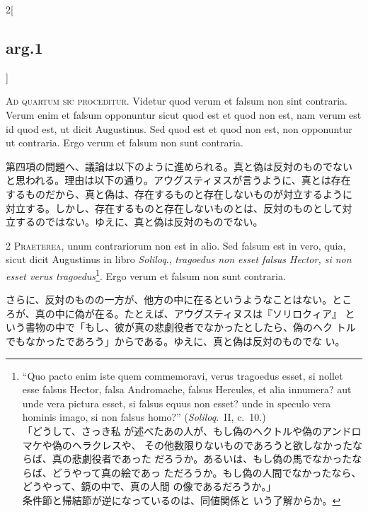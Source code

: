 \documentclass[paper=a4paper,fontsize=10pt,jafontsize=9pt,titlepage]{jlreq}
\begin{document}
\begin{paracol}{2}[\subsection{arg.1}]


{\huge A}{\scshape d quartum sic proceditur}. Videtur quod verum et
falsum non sint contraria. Verum enim et falsum opponuntur sicut quod
est et quod non est, nam verum est id quod est, ut dicit
Augustinus. Sed quod est et quod non est, non opponuntur ut
contraria. Ergo verum et falsum non sunt contraria.

\switchcolumn

第四項の問題へ、議論は以下のように進められる。真と偽は反対のものでない
と思われる。理由は以下の通り。アウグスティヌスが言うように、真とは存在
するものだから、真と偽は、存在するものと存在しないものが対立するように
対立する。しかし、存在するものと存在しないものとは、反対のものとして対
立するのではない。ゆえに、真と偽は反対のものでない。



{\scshape 2 Praeterea}, unum contrariorum non est in alio. Sed falsum
est in vero, quia, sicut dicit Augustinus in libro {\itshape
Soliloq}., {\itshape tragoedus non esset falsus Hector, si non esset
verus tragoedus}\footnote{ ``Quo pacto enim iste quem commemoravi,
verus tragoedus esset, si nollet esse falsus Hector, falsa Andromache,
falsus Hercules, et alia innumera? aut unde vera pictura esset, si
falsus equus non esset? unde in speculo vera hominis imago, si non
falsus homo?''  ({\itshape Soliloq}.~II, c.~10.)\\「どうして、さっき私
が述べたあの人が、もし偽のヘクトルや偽のアンドロマケや偽のヘラクレスや、
その他数限りないものであろうと欲しなかったならば、真の悲劇役者であった
だろうか。あるいは、もし偽の馬でなかったならば、どうやって真の絵であっ
ただろうか。もし偽の人間でなかったなら、どうやって、鏡の中で、真の人間
の像であるだろうか。」\\条件節と帰結節が逆になっているのは、同値関係と
いう了解からか。}. Ergo verum et falsum non sunt contraria.

\switchcolumn

さらに、反対のものの一方が、他方の中に在るというようなことはない。とこ
 ろが、真の中に偽が在る。たとえば、アウグスティヌスは『ソリロクィア』
 という書物の中で「もし、彼が真の悲劇役者でなかったとしたら、偽のヘク
 トルでもなかったであろう」からである。ゆえに、真と偽は反対のものでな
 い。


\end{paracol}
\end{document}
